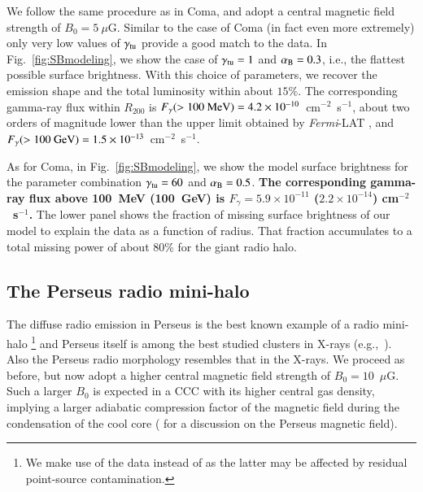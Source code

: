 \documentclass[useAMS,usenatbib]{mn2e}
\begin{document}
We follow the same procedure as in Coma, and adopt a central magnetic field
strength of $B_{0}=5~\mu$G. Similar to the case of Coma (in fact even more
extremely) only very low values of $\gamma_{{\mathrm{tu}}}$ provide a good match to
the data.  In Fig.~\ref{fig:SBmodeling}, we show the case of
$\gamma_{{\mathrm{tu}}}=1$ and $ \alpha_{{\mathrm{B}}}=0.3$, i.e., the flattest possible surface
brightness. With this choice of parameters, we recover the emission shape and
the total luminosity within about $15\%$.  The corresponding gamma-ray flux
within $R_{200}$ is $F_{\gamma} (>100~{\mathrm{MeV}}) = 4.2
\times10^{-10}$~cm$^{-2}$~s$^{-1}$, about two orders of magnitude lower than the
upper limit obtained by \emph{Fermi}-LAT \citep{2010ApJ...717L..71A}, and
$F_{\gamma} (>100~{\mathrm{GeV}}) =1.5 \times10^{-13}$~cm$^{-2}$~s$^{-1}$.

As for Coma, in Fig.~\ref{fig:SBmodeling}, we show the model surface brightness
for the parameter combination $\gamma_{{\mathrm{tu}}} = 60$ and
$\alpha_{{\mathrm{B}}}=0.5$. {\bf The corresponding gamma-ray flux above 100~MeV 
(100~GeV) is $F_{\gamma} = 5.9 \times 10^{-11}$ ($2.2 \times
10^{-14}$) cm$^{-2}$~s$^{-1}$.} The lower panel shows the fraction
of missing surface brightness of our model to explain the data as a function of
radius. That fraction accumulates to a total missing power of about 80\% for the
giant radio halo.


\subsection{The Perseus radio mini-halo}

The diffuse radio emission in Perseus is the best known example of a radio
mini-halo \citep{1990MNRAS.246..477P}\footnote{We make use of the
  \citet{1990MNRAS.246..477P} data instead of \citet{Sijbring1993} as the latter
  may be affected by residual point-source contamination.}  and Perseus itself
is among the best studied clusters in X-rays
(e.g.,~\citealp{2003ApJ...590..225C,2006MNRAS.366..417F,2011arXiv1105.5025F}). Also
the Perseus radio morphology resembles that in the X-rays. We proceed as before,
but now adopt a higher central magnetic field strength of
$B_{0}=10$~$\mu$G. Such a larger $B_0$ is expected in a CCC with its higher
central gas density, implying a larger adiabatic compression factor of the
magnetic field during the condensation of the cool core
(\citealp{2010ApJ...710..634A,2011arXiv1111.5544M} for a discussion on the
Perseus magnetic field).
\end{document}
